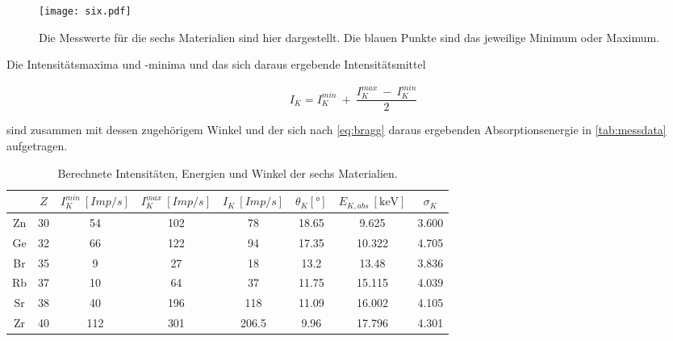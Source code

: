 \begin{figure}[htbp]
  \centering
  \texttt{[image: six.pdf]}
  \caption{Die Messwerte für die sechs Materialien sind hier dargestellt. Die blauen Punkte sind das jeweilige Minimum oder Maximum.}
  \label{fig:six}
\end{figure}

Die Intensitätsmaxima und -minima und das sich daraus ergebende Intensitätsmittel 

\begin{equation}
  I_K = I_K^{min}\ +\ \frac{I_K^{max}\ -\ I_K^{min}}{2}
\end{equation}

sind zusammen mit dessen zugehörigem Winkel und der sich nach \autoref{eq:bragg} daraus ergebenden Absorptionsenergie in \autoref{tab:messdata} aufgetragen.

\begin{table}
  \centering
  \caption{Berechnete Intensitäten, Energien und Winkel der sechs Materialien.}
  \begin{tabular}{c c c c c c c c}
    \toprule
    $ $ & $Z$ & $I_K^{min}\ [Imp/s]$ & $I_K^{max}\ [Imp/s]$ & $I_K\ [Imp/s]$ & $\theta_K[\si{\degree}]$ & $E_{K,abs}\ [\si{\kilo\electronvolt}]$ & $\sigma_K$\\
    \midrule
    Zn & 30 & 54 & 102 & 78 & 18.65 & 9.625 & 3.600\\ \hline
    Ge & 32 & 66 & 122 & 94 & 17.35 & 10.322 & 4.705\\ \hline
    Br & 35 & 9 & 27 & 18 & 13.2 & 13.48 & 3.836\\ \hline
    Rb & 37 & 10 & 64 & 37 & 11.75 & 15.115 & 4.039\\ \hline
    Sr & 38 & 40 & 196 & 118 & 11.09 & 16.002 & 4.105\\ \hline
    Zr & 40 & 112 & 301 & 206.5 & 9.96 & 17.796 & 4.301\\
    \bottomrule
  \end{tabular}
  \label{tab:messdata}
\end{table}